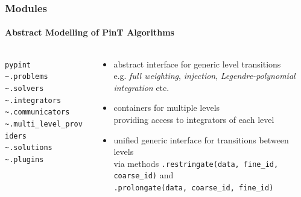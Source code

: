 \documentclass[%
  english,
  hyperref={pdfpagelabels=false},
  aspectratio=1610]{beamer}
\begin{document}
\begin{frame}
  \frametitle{Modules}
  \framesubtitle{Abstract Modelling of PinT Algorithms}
  \vspace{-5em}
  \begin{columns}[T]
    \begin{column}{5cm}
      \color{fzjblue50}%
      \texttt{pypint}\\
      \color{fzjgray30}%
      \hspace{0.75em}\texttt{\textasciitilde.problems}\\
      \hspace{0.75em}\texttt{\textasciitilde.solvers}\\
      \hspace{0.75em}\texttt{\textasciitilde.integrators}\\
      \hspace{0.75em}\texttt{\textasciitilde.communicators}\\
      \color{fzjblue50}%
      \hspace{0.75em}\texttt{\textasciitilde.multi\_level\_providers}\\
      \color{fzjgray30}%
      \hspace{0.75em}\texttt{\textasciitilde.solutions}\\
      \hspace{0.75em}\texttt{\textasciitilde.plugins}
    \end{column}
    \begin{column}{10cm}
      \begin{itemize}
        \item abstract interface for generic level transitions\\
          {\scriptsize e.g. \emph{full weighting}, \emph{injection}, \emph{Legendre-polynomial integration} etc.\\}
        \item containers for multiple levels\\
          {\scriptsize providing access to integrators of each level\\}
        \item unified generic interface for transitions between levels\\
          {\scriptsize via methods \texttt{.restringate(data, fine\_id, coarse\_id)} and\\[-0.5em]
           \texttt{.prolongate(data, coarse\_id, fine\_id)}}
      \end{itemize}
      

\end{column}
\end{columns}
\end{frame}
\end{document}
